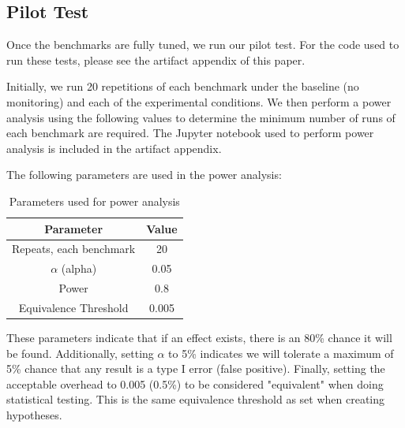 \documentclass[conference]{IEEEtran}
\begin{document}



\subsection{Pilot Test}

Once the benchmarks are fully tuned, we run our pilot test. For the code used 
to run these tests, please see the artifact appendix of this paper.

Initially, we run 20 repetitions of each benchmark under the baseline 
(no monitoring) and each of the experimental conditions. We then perform a 
power analysis using the following values to determine the minimum number of 
runs of each benchmark are required. The Jupyter notebook used to perform power 
analysis is included in the artifact appendix.

The following parameters are used in the power analysis:

\begin{table}[h!]
\centering
\begin{tabular}{| c | c |} 
    \hline
    Parameter & Value \\ [0.5ex] 
    \hline
    Repeats, each benchmark & 20 \\ 
    \hline
    $\alpha$ (alpha) & 0.05 \\ 
    \hline
    Power & 0.8 \\
    \hline
    Equivalence Threshold & 0.005 \\
    \hline
\end{tabular}
\caption{Parameters used for power analysis}
\label{table:power_params}
\end{table}

These parameters indicate that if an effect exists, there is an 80\% chance it 
will be found. Additionally, setting $\alpha$ to 5\% indicates we will tolerate a 
maximum of 5\% chance that any result is a type I error (false positive). Finally,
setting the acceptable overhead to 0.005 (0.5\%) to be considered "equivalent" 
when doing statistical testing. This is the same equivalence threshold as set 
when creating hypotheses.
\end{document}
